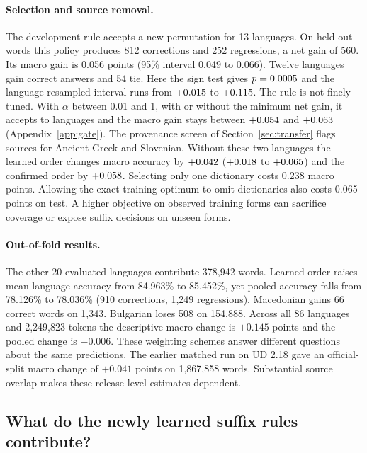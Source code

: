 \documentclass[11pt]{article}
\begin{document}
\paragraph{Selection and source removal.}
The development rule accepts a new permutation for 13 languages. On held-out
words this policy produces 812 corrections and 252 regressions, a net gain
of 560. Its macro gain is 0.056 points (95\% interval 0.049 to 0.066).
Twelve languages gain correct answers and 54 tie. Here the sign test gives
\(p=0.0005\) and the language-resampled interval runs from
\(+0.015\) to \(+0.115\). The rule is not finely tuned.
With \(\alpha\) between 0.01 and 1, with or without the minimum net gain,
it accepts \anGridAcceptMin{} to \anGridAcceptMax{} languages and the macro
gain stays between \(+0.054\) and \(+0.063\)
(Appendix~\ref{app:gate}). The provenance screen of
Section~\ref{sec:transfer} flags sources for Ancient Greek and Slovenian.
Without these two languages the learned order changes macro accuracy by
\(+0.042\) (\(+0.018\) to \(+0.065\)) and the confirmed
order by \(+0.058\). Selecting only one
dictionary costs 0.238 macro points. Allowing the exact training optimum
to omit dictionaries also costs 0.065 points on test. A higher objective
on observed training forms can sacrifice coverage or expose suffix decisions
on unseen forms.

\paragraph{Out-of-fold results.}
The other 20 evaluated languages contribute 378,942 words. Learned order
raises mean language accuracy from 84.963\% to 85.452\%, yet pooled accuracy
falls from 78.126\% to 78.036\% (910 corrections, 1,249 regressions).
Macedonian gains 66 correct words on 1,343. Bulgarian loses 508 on
154,888. Across all 86 languages and 2,249,823 tokens the descriptive
macro change is \(+0.145\) points and the pooled change is \(-0.006\).
These weighting schemes answer different questions about the same predictions.
The earlier matched run on UD 2.18 \citep{ud218} gave an official-split macro change of
\(+0.041\) points on 1,867,858 words. Substantial source overlap makes
these release-level estimates dependent.

\subsection{What do the newly learned suffix rules contribute?}
\end{document}
